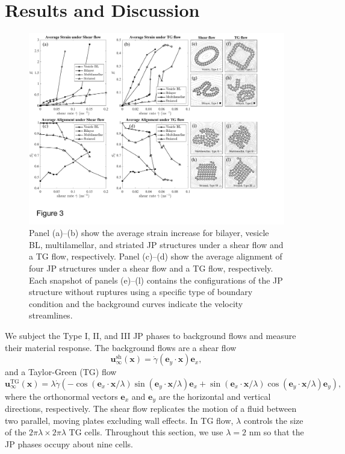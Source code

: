 \documentclass[prb,preprint,showpacs,preprintnumbers,amsmath,amssymb,longbibliography]{revtex4-2}
\newcommand{\ee}{\mathbf{e}}
\newcommand{\xx}{\mathbf{x}}
\newcommand{\uu}{\mathbf{u}}
\begin{document}
\section{Results and Discussion}
\label{sec:results}
\begin{figure}[t]
\begin{center}
\includegraphics[width=\textwidth]{S2ESummary.pdf}
\end{center}
\caption{\label{fig:s2esummary}
  Panel (a)--(b) show the average strain increase for bilayer, vesicle
  BL, multilamellar, and striated JP structures under a shear flow and a
  TG flow, respectively. Panel (c)--(d) show the average alignment of
  four JP structures under a shear flow and a TG flow, respectively.
  Each snapshot of panels (e)--(l) contains the configurations of the JP
  structure without ruptures using a specific type of boundary condition
  and the background curves indicate the velocity streamlines.}
\end{figure}
%
We subject the Type I, II, and III JP phases to background flows and
measure their material response. The background flows are a shear flow
\begin{equation}
\label{eq:sh_flow}
\uu_\infty^{\text{sh}}(\xx) = 
\dot\gamma (\ee_y \cdot \mathbf{x})\ee_x,
\end{equation}
and a Taylor-Green (TG) flow
\begin{equation}
\label{eq:tg_flow}
\uu_\infty^{\text{TG}}(\xx) = 
\lambda \dot \gamma \left(
-\cos(\ee_x\cdot\xx/\lambda)\sin(\ee_y\cdot\xx/\lambda)\ee_x
+\sin(\ee_x\cdot\xx/\lambda)\cos(\ee_y\cdot\xx/\lambda)\ee_y\right),
\end{equation}
where the orthonormal vectors $\ee_x$ and $\ee_y$ are the horizontal and
vertical directions, respectively. The shear flow replicates the motion
of a fluid between two parallel, moving plates excluding wall effects.
In TG flow, $\lambda$ controls the size of the $2\pi \lambda \times 2\pi
\lambda$ TG cells. Throughout this section, we use $\lambda = 2$ nm so that the JP
phases occupy about nine cells.
\end{document}

